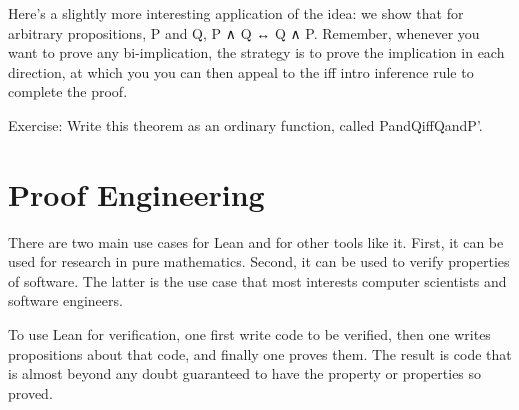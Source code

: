 \documentclass[letterpaper,10pt,english]{sphinxmanual}
\begin{document}
Here’s a slightly more interesting application of the idea: we show
that for arbitrary propositions, P and Q, P ∧ Q ↔ Q ∧ P. Remember,
whenever you want to prove any bi-implication, the strategy is to
prove the implication in each direction, at which you you can then
appeal to the iff intro inference rule to complete the proof.

\begin{sphinxVerbatim}[commandchars=\\\{\}]
             
     
                        
\end{sphinxVerbatim}

Exercise: Write this theorem as an ordinary function, called
PandQiffQandP’.


\section{Proof Engineering}
\label{\detokenize{15-proofs:proof-engineering}}
There are two main use cases for Lean and for other tools like
it. First, it can be used for research in pure mathematics. Second, it
can be used to verify properties of software. The latter is the use
case that most interests computer scientists and software engineers.

To use Lean for verification, one first write code to be verified,
then one writes propositions about that code, and finally one proves
them. The result is code that is almost beyond any doubt guaranteed to
have the property or properties so proved.
\end{document}

